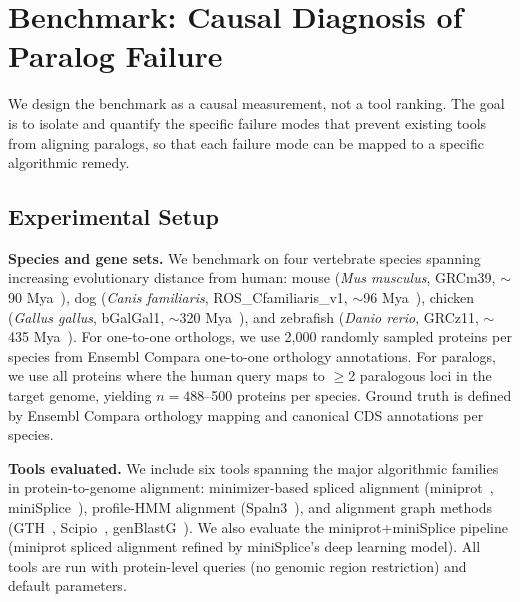 \section{Benchmark: Causal Diagnosis of Paralog Failure}

We design the benchmark as a causal measurement, not a tool ranking. The goal is to isolate and quantify the specific failure modes that prevent existing tools from aligning paralogs, so that each failure mode can be mapped to a specific algorithmic remedy.

\subsection{Experimental Setup}

\textbf{Species and gene sets.} We benchmark on four vertebrate species spanning increasing evolutionary distance from human: mouse (\textit{Mus musculus}, GRCm39, $\sim$90 Mya~\cite{waterston2002mouse}), dog (\textit{Canis familiaris}, ROS\_Cfamiliaris\_v1, $\sim$96 Mya~\cite{lindblad2005dog}), chicken (\textit{Gallus gallus}, bGalGal1, $\sim$320 Mya~\cite{hillier2004chicken}), and zebrafish (\textit{Danio rerio}, GRCz11, $\sim$435 Mya~\cite{howe2013zebrafish}). For one-to-one orthologs, we use 2,000 randomly sampled proteins per species from Ensembl Compara one-to-one orthology annotations. For paralogs, we use all proteins where the human query maps to $\geq$2 paralogous loci in the target genome, yielding $n = 488$--500 proteins per species. Ground truth is defined by Ensembl Compara orthology mapping and canonical CDS annotations per species.

\textbf{Tools evaluated.} We include six tools spanning the major algorithmic families in protein-to-genome alignment: minimizer-based spliced alignment (miniprot~\cite{li2023miniprot}, miniSplice~\cite{zhang2025minisplice}), profile-HMM alignment (Spaln3~\cite{gotoh2024spaln3}), and alignment graph methods (GTH~\cite{gremme2005genomethreader}, Scipio~\cite{keller2008scipio}, genBlastG~\cite{she2011genblastg}). We also evaluate the miniprot+miniSplice pipeline (miniprot spliced alignment refined by miniSplice's deep learning model). All tools are run with protein-level queries (no genomic region restriction) and default parameters.

